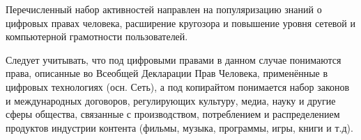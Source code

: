 \documentclass[10pt, a5paper]{article}
\begin{document}
Перечисленный набор активностей направлен на популяризацию знаний о цифровых правах человека, расширение кругозора и повышение уровня сетевой и компьютерной грамотности пользователей.

Следует учитывать, что под цифровыми правами в данном случае понимаются права, описанные во Всеобщей Декларации Прав Человека, применённые в цифровых технологиях (осн. Сеть), а под копирайтом понимается набор законов и международных договоров, регулирующих культуру, медиа, науку и другие сферы общества, связанные с производством, потреблением и распределением продуктов индустрии контента (фильмы, музыка, программы, игры, книги и т.д).
\end{document}
